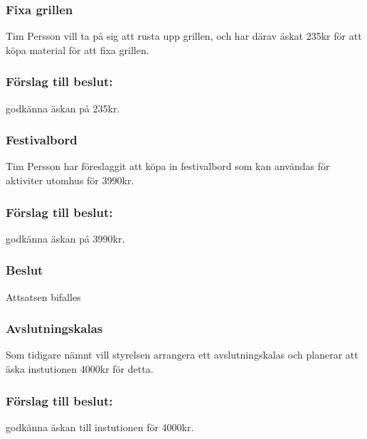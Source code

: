 \documentclass[protokoll]{dvd}
\begin{document}
\subsubsection*{Fixa grillen}
Tim Persson vill ta på sig att rusta upp grillen, och har därav äskat 235kr
för att köpa material för att fixa grillen.
\subsubsection*{Förslag till beslut:}
\begin{attsatser}
    \item godkänna äskan på 235kr.
\end{attsatser}

\subsubsection*{Festivalbord}
Tim Persson har föreslaggit att köpa in festivalbord som kan användas för
aktiviter utomhus för 3990kr.
\subsubsection*{Förslag till beslut:}
\begin{attsatser}
    \item godkänna äskan på 3990kr.
\end{attsatser}

\subsubsection*{Beslut}
\begin{attsatser}
    \item Attsatsen bifalles
\end{attsatser}

\subsubsection*{Avslutningskalas}
Som tidigare nämnt vill styrelsen arrangera ett avslutningskalas och planerar
att äska instutionen 4000kr för detta.
\subsubsection*{Förslag till beslut:}
\begin{attsatser}
    \item godkänna äskan till instutionen för 4000kr.
\end{attsatser}
\end{document}
